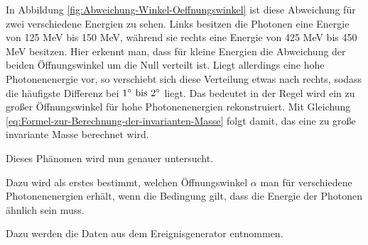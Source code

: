 \documentclass[a4paper,11pt,oneside,final,german,openbib,pdftex]{scrbook}
\begin{document}
{In Abbildung \ref{fig:Abweichung-Winkel-Oeffnungswinkel} ist diese Abweichung f\"ur zwei verschiedene Energien zu sehen. Links besitzen die Photonen eine Energie von 125 MeV bis 150 MeV, w\"ahrend sie rechts eine Energie von 425 MeV bis 450 MeV besitzen. Hier erkennt man, dass f\"ur kleine Energien die Abweichung der beiden \"Offnungswinkel um die Null verteilt ist. Liegt allerdings eine hohe Photonenenergie vor, so verschiebt sich diese Verteilung etwas nach rechts, sodass die h\"aufigste Differenz bei $1^{\circ} \textnormal{ bis } 2^{\circ}$ liegt. Das bedeutet in der Regel wird ein zu gro{\ss}er \"Offnungswinkel f\"ur hohe Photonenenergien rekonstruiert.
Mit Gleichung \ref{eq:Formel-zur-Berechnung-der-invarianten-Masse} folgt damit, das eine zu gro{\ss}e invariante Masse berechnet wird.
 
 Dieses Ph\"anomen wird nun genauer untersucht.

Dazu wird als erstes bestimmt, welchen \"Offnungswinkel $\alpha$ man f\"ur verschiedene Photonenenergien erh\"alt, wenn die Bedingung gilt, dass die Energie der Photonen \"ahnlich sein muss.

Dazu werden die Daten aus dem Ereignisgenerator entnommen.


}
\end{document}
